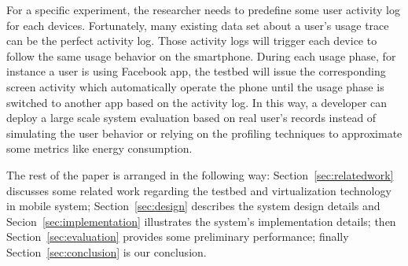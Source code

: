 For a specific experiment, the researcher needs to predefine some user activity log for each devices. Fortunately, many existing data set about a user's usage trace can be the perfect activity log. Those activity logs will trigger each device to follow the same usage behavior on the smartphone. During each usage phase, for instance a user is using Facebook app, the testbed will issue the corresponding screen activity which automatically operate the phone until the usage phase is switched to another app based on the activity log. In this way, a developer can deploy a large scale system evaluation based on real user's records instead of simulating the user behavior or relying on the profiling techniques to approximate some metrics like energy consumption.

The rest of the paper is arranged in the following way: Section~\ref{sec:relatedwork} discusses some related work regarding the testbed and virtualization technology in mobile system; Section~\ref{sec:design} describes the system design details and Secion~\ref{sec:implementation} illustrates the system's implementation details; then Section~\ref{sec:evaluation} provides some preliminary performance; finally Section~\ref{sec:conclusion} is our conclusion.
